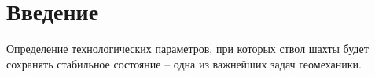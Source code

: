 \documentclass[a4paper,14pt]{scrartcl}
\begin{document}


\tableofcontents
\newpage

\section{Введение}
Определение технологических параметров, при которых ствол шахты будет сохранять стабильное состояние – одна из важнейших задач геомеханики.  
\end{document}
